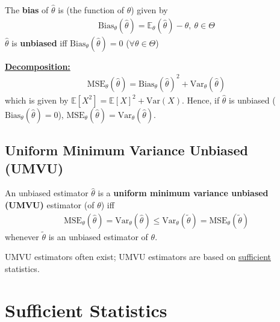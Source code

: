 \documentclass[11pt]{elegantbook}
\begin{document}
\begin{definition}[Bias]
    \normalfont
    The \textbf{bias} of $\hat{\theta}$ is (the function of $\theta$) given by
    \begin{equation}
        \begin{aligned}
            \text{Bias}_\theta(\hat{\theta})=\mathbb{E}_\theta(\hat{\theta})-\theta,\ \theta\in\Theta
        \end{aligned}
        \nonumber
    \end{equation}
    $\hat{\theta}$ is \textbf{unbiased} iff $\text{Bias}_\theta(\hat{\theta})=0$ ($\forall \theta\in \Theta$)
\end{definition}
\textbf{\underline{Decomposition:}}
\begin{equation}
    \begin{aligned}
        \text{MSE}_\theta(\hat{\theta})=\text{Bias}_\theta(\hat{\theta})^2+\text{Var}_\theta(\hat{\theta})
    \end{aligned}
    \nonumber
\end{equation}
which is given by $\mathbb{E}[X^2]=\mathbb{E}[X]^2+\text{Var}(X)$. Hence, if $\hat{\theta}$ is unbiased ($\text{Bias}_\theta(\hat{\theta})=0$), $\text{MSE}_\theta(\hat{\theta})=\text{Var}_\theta(\hat{\theta})$.

\subsection{Uniform Minimum Variance Unbiased (UMVU)}
\begin{definition}
    \normalfont
    An unbiased estimator $\hat{\theta}$ is a \textbf{uniform minimum variance unbiased (UMVU)} estimator (of $\theta$) iff
    \begin{equation}
        \begin{aligned}
            \text{MSE}_\theta(\hat{\theta})=\text{Var}_\theta(\hat{\theta})\leq \text{Var}_\theta(\tilde{\theta})=\text{MSE}_\theta(\tilde{\theta})
        \end{aligned}
        \nonumber
    \end{equation}
    whenever $\tilde{\theta}$ is an unbiased estimator of $\theta$.
\end{definition}
\begin{remark}
    UMVU estimators often exist; UMVU estimators are based on \underline{sufficient} statistics.
\end{remark}

\section{Sufficient Statistics}
\end{document}
